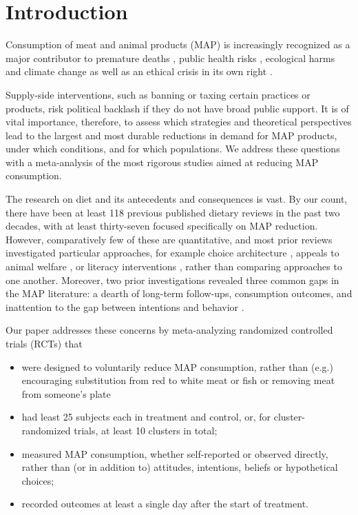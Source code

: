 \documentclass[sn-nature,pdflatex]{sn-jnl}
\begin{document}
\maketitle

\section{Introduction}\label{sec1}

Consumption of meat and animal products (MAP) is increasingly recognized
as a major contributor to premature deaths
\citep{willett2019, landry2023}, public health risks
\citep{slingenbergh2004, graham2008}, ecological harms
\citep{greger2010} and climate change
\citep{scarborough2023, koneswaran2008} as well as an ethical crisis in
its own right \citep{kuruc2023, singer2023}.

Supply-side interventions, such as banning or taxing certain practices
or products, risk political backlash if they do not have broad public
support. It is of vital importance, therefore, to assess which
strategies and theoretical perspectives lead to the largest and most
durable reductions in demand for MAP products, under which conditions,
and for which populations. We address these questions with a
meta-analysis of the most rigorous studies aimed at reducing MAP
consumption.

The research on diet and its antecedents and consequences is vast. By
our count, there have been at least 118 previous published dietary
reviews in the past two decades, with at least thirty-seven focused
specifically on MAP reduction. However, comparatively few of these are
quantitative, and most prior reviews investigated particular approaches,
for example choice architecture \citep{bianchi2018restructuring},
appeals to animal welfare \citep{mathur2021effectiveness}, or literacy
interventions \citep{DiGennaro2024}, rather than comparing approaches to
one another. Moreover, two prior investigations revealed three common
gaps in the MAP literature: a dearth of long-term follow-ups,
consumption outcomes, and inattention to the gap between intentions and
behavior \citep{mathur2021meta, mathur2021effectiveness}.

Our paper addresses these concerns by meta-analyzing randomized
controlled trials (RCTs) that

\begin{itemize}
\item
  were designed to voluntarily reduce MAP consumption, rather than
  (e.g.) encouraging substitution from red to white meat or fish or
  removing meat from someone's plate
\item
  had least 25 subjects each in treatment and control, or, for
  cluster-randomized trials, at least 10 clusters in total;
\item
  measured MAP consumption, whether self-reported or observed directly,
  rather than (or in addition to) attitudes, intentions, beliefs or
  hypothetical choices;
\item
  recorded outcomes at least a single day after the start of treatment.
\end{itemize}
\end{document}
